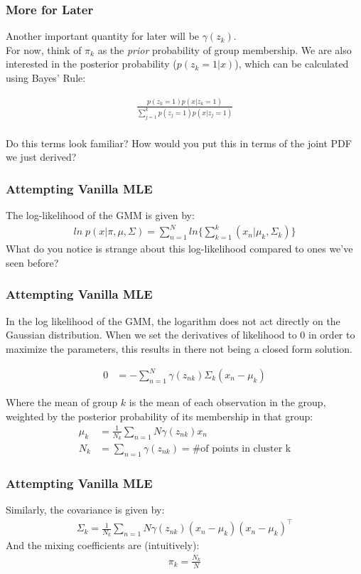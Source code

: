 \documentclass{beamer}
\begin{document}
\begin{frame}
\frametitle{More for Later}
Another important quantity for later will be $\gamma(z_k)$.\\
For now, think of $\pi_k$ as the \textit{prior} probability of group membership. We are also interested in the posterior probability ($p(z_k = 1|x) $), which can be calculated using Bayes' Rule:

\begin{align*}
  \frac{p(z_k = 1) p(x|z_k =1 )}{\sum_{j = 1}^{k} p(z_j = 1) p(x|z_j=1)}\\
\end{align*}

Do this terms look familiar? How would you put this in terms of the joint PDF we just derived?
\end{frame}

\begin{frame}
	\frametitle{Attempting Vanilla MLE}
	The log-likelihood of the GMM is given by:
	\begin{align*}
	ln\; p(x|\pi, \mu, \Sigma) = \sum_{n=1}^{N} ln\{\sum_{k=1}^{k} (x_n | \mu_k, \Sigma_k) \}
	\end{align*}
	What do you notice is strange about this log-likelihood compared to ones we've seen before?
\end{frame}

\begin{frame}
\frametitle{Attempting Vanilla MLE}
	In the log likelihood of the GMM, the logarithm does not act directly on the Gaussian distribution. When we set the derivatives of likelihood to $0$ in order to maximize the parameters, this results in there not being a closed form solution.
	
	\begin{align*}
	 0&= -\sum_{n=1}^{N} \gamma(z_{nk}) \Sigma_k(x_n - \mu_k)
	\end{align*}
	
	Where the mean of group $k$ is the mean of each observation in the group, weighted by the posterior probability of its membership in that group:
	\begin{align*}
		 \mu_k &= \frac{1}{N_k} \sum_{n=1}{N} \gamma(z_{nk})x_n \\
		 N_k &= \sum_{n=1} \gamma({z_{nk}}) = \text{\# of points in cluster k}
	\end{align*}
	
\end{frame}

\begin{frame}
\frametitle{Attempting Vanilla MLE}	
	Similarly, the covariance is given by:
	\begin{align*}
	\Sigma_k = \frac{1}{N_k} \sum_{n=1}{N} \gamma(z_{nk})(x_n - \mu_k)(x_n - \mu_k)^\intercal
	\end{align*}
	And the mixing coefficients are (intuitively):
	\begin{align*}
	\pi_k = \frac{N_k}{N}
	\end{align*}
\end{frame}
\end{document}
